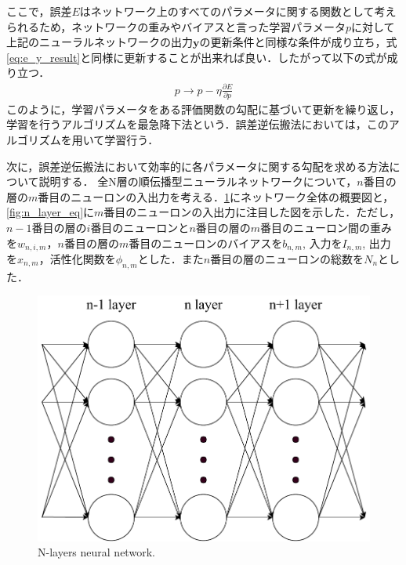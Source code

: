     ここで，誤差$E$はネットワーク上のすべてのパラメータに関する関数として考えられるため，ネットワークの重みやバイアスと言った学習パラメータ$p$に対して上記のニューラルネットワークの出力$\bm{y}$の更新条件と同様な条件が成り立ち，式\ref{eq:e_y_result}と同様に更新することが出来れば良い．したがって以下の式が成り立つ．
    \begin{align}
      p \to p - \eta \frac{\partial E}{\partial p}
      \label{eq:p_y_result}
    \end{align}
    このように，学習パラメータをある評価関数の勾配に基づいて更新を繰り返し，学習を行うアルゴリズムを最急降下法という．誤差逆伝搬法においては，このアルゴリズムを用いて学習行う．
    
    次に，誤差逆伝搬法において効率的に各パラメータに関する勾配を求める方法について説明する．
    全$\text{N}$層の順伝播型ニューラルネットワークについて，$n$番目の層の$m$番目のニューロンの入出力を考える．\ref{fig:n_layer_network}にネットワーク全体の概要図と，\ref{fig:n_layer_eq}に$m$番目のニューロンの入出力に注目した図を示した．ただし，$n-1$番目の層の$i$番目のニューロンと$n$番目の層の$m$番目のニューロン間の重みを$w_{n, i, m}$，$n$番目の層の$m$番目のニューロンのバイアスを$b_{n, m}$, 入力を$I_{n, m}$, 出力を$x_{n, m}$，活性化関数を$\phi _{n, m}$とした．また$n$番目の層のニューロンの総数を$N_{n}$とした．
    \begin{figure}[ht]
      \centering
      \includegraphics[width=12cm]{8_appendix/img/n_layer_network.pdf}
      \caption{N-layers neural network.}
      \label{fig:n_layer_network}
    \end{figure}
